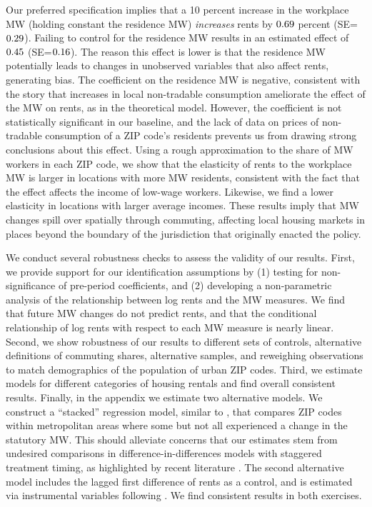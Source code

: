 Our preferred specification implies that 
a 10 percent increase in the workplace MW (holding constant the residence MW) 
\textit{increases} rents by $0.69$ percent 
(SE=$0.29$).
Failing to control for the residence MW results in an estimated effect of 
$0.45$ (SE=$0.16$).
The reason this effect is lower is that the residence MW potentially leads to 
changes in unobserved variables that also affect rents, generating bias.
The coefficient on the residence MW is negative, consistent with the story 
that increases in local non-tradable consumption ameliorate the effect of the
MW on rents, as in the theoretical model.
However, the coefficient is not statistically significant in our baseline,
and the lack of data on prices of non-tradable consumption of a ZIP code's 
residents prevents us from drawing strong conclusions about this effect.
Using a rough approximation to the share of MW workers in each ZIP code, we show 
that the elasticity of rents to the workplace MW is larger in locations 
with more MW residents, consistent with the fact that the effect affects 
the income of low-wage workers.
Likewise, we find a lower elasticity in locations with larger average incomes.
These results imply that MW changes spill over spatially through commuting, 
affecting local housing markets in places beyond the boundary of the 
jurisdiction that originally enacted the policy.


We conduct several robustness checks to assess the validity of our results.
First, we provide support for our identification assumptions by
(1) testing for non-significance of pre-period coefficients, and 
(2) developing a non-parametric analysis of the relationship between log rents
and the MW measures.
We find that future MW changes do not predict rents, and that the conditional
relationship of log rents with respect to each MW measure is nearly linear.
Second, we show robustness of our results to different sets of controls,
alternative definitions of commuting shares, alternative samples,
and reweighing observations to match demographics of the population of
urban ZIP codes.
Third, we estimate models for different categories of housing rentals and
find overall consistent results.
Finally, in the appendix we estimate two alternative models.
We construct a ``stacked'' regression model, similar to \textcite{CegnizEtAl2019},
that compares ZIP codes within metropolitan areas where some but not all 
experienced a change in the statutory MW.
This should alleviate concerns that our estimates stem from undesired 
comparisons in difference-in-differences models with staggered treatment 
timing, as highlighted by recent literature 
\parencite{deChaisemartinEtAl2022,RothEtAl2022}.
The second alternative model includes the lagged first difference of rents 
as a control, and is estimated via instrumental variables following 
\textcite{ArellanoBond1991}.
We find consistent results in both exercises.


